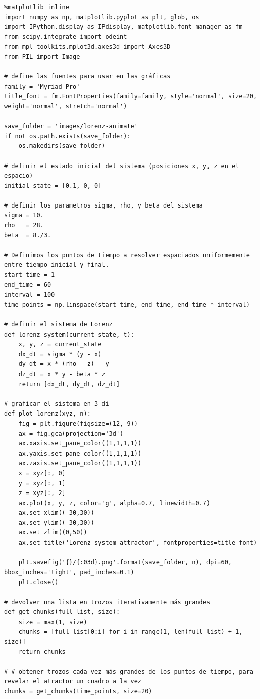 \documentclass[12pt]{article}
\begin{document}
\begin{verbatim}
%matplotlib inline
import numpy as np, matplotlib.pyplot as plt, glob, os
import IPython.display as IPdisplay, matplotlib.font_manager as fm
from scipy.integrate import odeint
from mpl_toolkits.mplot3d.axes3d import Axes3D
from PIL import Image

# define las fuentes para usar en las gráficas
family = 'Myriad Pro'
title_font = fm.FontProperties(family=family, style='normal', size=20, weight='normal', stretch='normal')

save_folder = 'images/lorenz-animate'
if not os.path.exists(save_folder):
    os.makedirs(save_folder)

# definir el estado inicial del sistema (posiciones x, y, z en el espacio)
initial_state = [0.1, 0, 0]

# definir los parametros sigma, rho, y beta del sistema
sigma = 10.
rho   = 28.
beta  = 8./3.

# Definimos los puntos de tiempo a resolver espaciados uniformemente entre tiempo inicial y final.
start_time = 1
end_time = 60
interval = 100
time_points = np.linspace(start_time, end_time, end_time * interval)

# definir el sistema de Lorenz
def lorenz_system(current_state, t):
    x, y, z = current_state
    dx_dt = sigma * (y - x)
    dy_dt = x * (rho - z) - y
    dz_dt = x * y - beta * z
    return [dx_dt, dy_dt, dz_dt]

# graficar el sistema en 3 di
def plot_lorenz(xyz, n):
    fig = plt.figure(figsize=(12, 9))
    ax = fig.gca(projection='3d')
    ax.xaxis.set_pane_color((1,1,1,1))
    ax.yaxis.set_pane_color((1,1,1,1))
    ax.zaxis.set_pane_color((1,1,1,1))
    x = xyz[:, 0]
    y = xyz[:, 1]
    z = xyz[:, 2]
    ax.plot(x, y, z, color='g', alpha=0.7, linewidth=0.7)
    ax.set_xlim((-30,30))
    ax.set_ylim((-30,30))
    ax.set_zlim((0,50))
    ax.set_title('Lorenz system attractor', fontproperties=title_font)
    
    plt.savefig('{}/{:03d}.png'.format(save_folder, n), dpi=60, bbox_inches='tight', pad_inches=0.1)
    plt.close()

# devolver una lista en trozos iterativamente más grandes
def get_chunks(full_list, size):
    size = max(1, size)
    chunks = [full_list[0:i] for i in range(1, len(full_list) + 1, size)]
    return chunks

# # obtener trozos cada vez más grandes de los puntos de tiempo, para revelar el atractor un cuadro a la vez
chunks = get_chunks(time_points, size=20)


\end{verbatim}
\end{document}
